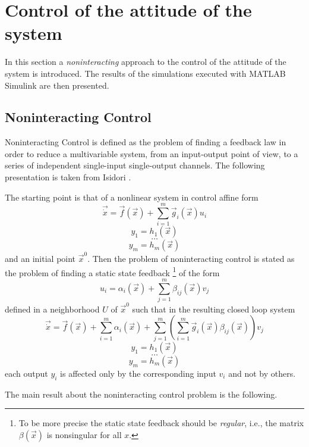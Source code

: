 \section{Control of the attitude of the system}
In this section a \emph{noninteracting} approach to the control of the
attitude of the system is introduced. The results of the simulations executed with
MATLAB Simulink are then presented.

\subsection{Noninteracting Control}
Noninteracting Control is defined as the problem of finding a feedback law in order
to reduce a multivariable system, from an input-output point of view, to a series of independent
single-input single-output channels. The following presentation is taken from Isidori \cite{Isidori1999}.
\par
The starting point is that of a nonlinear system in control affine form
\[
\vec{\dot{x}} = \vec{f}(\vec{x}) + \sum\limits_{i=1}^m \vec{g}_{i}(\vec{x}) u_{i}
\]
\[
y_{1} = h_{1}(\vec{x})
\]
\[
\hdots
\]
\[
y_{m} = h_{m}(\vec{x})
\]
and an initial point $\vec{x}^{0}$. Then the problem of noninteracting control is stated
as the problem of finding a static state feedback
\footnote{To be more precise the static state feedback should be \emph{regular}, i.e., the
  matrix $\beta(\vec{x})$ is nonsingular for all $x$.}
of the form
\begin{equation}\label{eq:nic_input}
  u_{i} = \alpha_{i}(\vec{x}) + \sum\limits_{j=1}^m \beta_{ij}(\vec{x})v_{j}
\end{equation}
defined in a neighborhood $U$ of $\vec{x}^{0}$ such that in the resulting closed loop system
\[
\vec{\dot{x}} = \vec{f}(\vec{x}) + \sum\limits_{i=1}^m \alpha_i(\vec{x}) +
\sum\limits_{j=1}^m\left(\sum\limits_{i=1}^m \vec{g}_i(\vec{x}) \beta_{ij}(\vec{x})\right)v_{j}
\]
\[
y_{1} = h_{1}(\vec{x})
\]
\[
\hdots
\]
\[
y_{m} = h_{m}(\vec{x})
\]
each output $y_i$ is affected only by the corresponding input $v_i$ and not by others.
\par
The main result \cite{Isidori1999} about the noninteracting control problem is the following.
